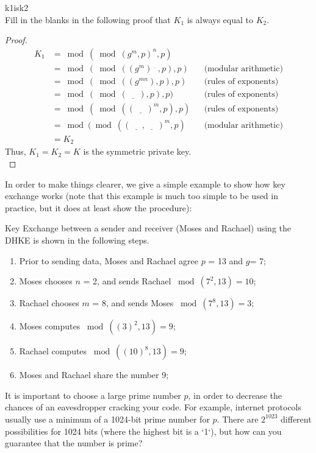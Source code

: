 \begin{exercise}{k1isk2}\\
Fill in the blanks in the following proof that  $K_1$ is always equal to  $K_2$.\\
  	\begin{proof} 
		\begin{align*} 
		K_1 &=   \bmod ( \bmod (g^m , p)^n , p ) 
           	\\&=  \bmod ( \bmod ((g^m)^{\underline{~~~~}} , p) , p )&& \text{(modular arithmetic)}	%
		\\&= \bmod ( \bmod ((g^{mn}) , p) , p )&&  \text{(rules of exponents)}	%
           	\\&= \bmod ( \bmod (\underline{~~~~~~}) , p) , p ) &&\text{(rules of exponents)}	%
           	\\&= \bmod ( \bmod ((\underline{~~~~~~})^m , p) , p )  &&\text{(rules of exponents)}	%
           	\\&= \bmod ( \bmod ((\underline{~~~~~~} , \underline{~~~~~~})^m , p )&&\text{(modular arithmetic)}   	%
		\\&= K_2
		\end{align*} 
   	Thus, $K_1 = K_2 = K$ is the symmetric private key.\\

  	\end{proof}
\end{exercise}

In order to make things clearer, we give a simple example to show how key exchange works (note that this example is much too simple to be used in practice, but it does at least show the procedure):

 \begin{eg} Key Exchange between a sender and receiver (Moses and Rachael) using the DHKE is shown in the following steps.
\begin{enumerate}[Step 1.]
\item Prior to sending data, Moses and Rachael agree $p$ = 13 and $g$= 7; 
\item Moses chooses $n$ = 2, and sends Rachael $\bmod (7^2 , 13) = 10$;
\item Rachael chooses $m$ = 8, and sends Moses $\bmod (7^8  , 13) = 3 $;
\item Moses computes $\bmod ((3)^2 , 13 ) = 9$;
\item Rachael computes $\bmod ((10)^8 , 13 ) = 9$;
\item Moses and Rachael share the number 9;
\end{enumerate}
\end{eg}
It is important to choose a large prime number $p$, in order to decrease the chances of an eavesdropper cracking your code.  For example, internet protocols usually use a minimum of a 1024-bit prime number for $p$.  There are $2^{1023}$ different possibilities for 1024 bits (where the highest bit is a `1`), but how can you guarantee that the number is prime?

